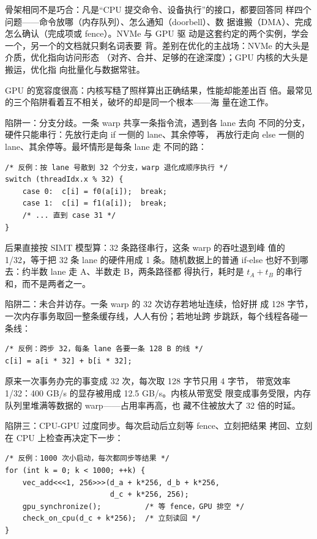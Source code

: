骨架相同不是巧合：凡是“CPU 提交命令、设备执行”的接口，都要回答同
样四个问题——命令放哪（内存队列）、怎么通知（doorbell）、数
据谁搬（DMA）、完成怎么确认（完成项或 fence）。NVMe 与 GPU 驱
动是这套约定的两个实例，学会一个，另一个的文档就只剩名词表要
背。差别在优化的主战场：NVMe 的大头是介质，优化指向访问形态
（对齐、合并、足够的在途深度）；GPU 内核的大头是搬运，优化指
向批量化与数据常驻。

GPU 的宽容度很高：内核写糙了照样算出正确结果，性能却能差出百
倍。最常见的三个陷阱看着互不相关，破坏的却是同一个根本——海
量在途工作。

陷阱一：分支分歧。一条 warp 共享一条指令流，遇到各 lane 去向
不同的分支，硬件只能串行：先放行走向 if 一侧的 lane、其余停等，
再放行走向 else 一侧的 lane、其余停等。最坏情形是每条 lane 走
不同的路：

\begin{lstlisting}
/* 反例：按 lane 号散到 32 个分支，warp 退化成顺序执行 */
switch (threadIdx.x % 32) {
    case 0:  c[i] = f0(a[i]);  break;
    case 1:  c[i] = f1(a[i]);  break;
    /* ... 直到 case 31 */
}
\end{lstlisting}

后果直接按 SIMT 模型算：32 条路径串行，这条 warp 的吞吐退到峰
值的 1/32，等于把 32 条 lane 的硬件用成 1 条。随机数据上的普通
if-else 也好不到哪去：约半数 lane 走 A、半数走 B，两条路径都
得执行，耗时是 $t_A+t_B$ 的串行和，而不是两者之一。

陷阱二：未合并访存。一条 warp 的 32 次访存若地址连续，恰好拼
成 128 字节，一次内存事务取回一整条缓存线，人人有份；若地址跨
步跳跃，每个线程各碰一条线：

\begin{lstlisting}
/* 反例：跨步 32，每条 lane 各要一条 128 B 的线 */
c[i] = a[i * 32] + b[i * 32];
\end{lstlisting}

原来一次事务办完的事变成 32 次，每次取 128 字节只用 4 字节，
带宽效率 1/32：400 GB/s 的显存被用成 12.5 GB/s。内核从带宽受
限变成事务受限，内存队列里堆满等数据的 warp——占用率再高，也
藏不住被放大了 32 倍的时延。

陷阱三：CPU-GPU 过度同步。每次启动后立刻等 fence、立刻把结果
拷回、立刻在 CPU 上检查再决定下一步：

\begin{lstlisting}
/* 反例：1000 次小启动，每次都同步等结果 */
for (int k = 0; k < 1000; ++k) {
    vec_add<<<1, 256>>>(d_a + k*256, d_b + k*256,
                        d_c + k*256, 256);
    gpu_synchronize();          /* 等 fence，GPU 排空 */
    check_on_cpu(d_c + k*256);  /* 立刻读回 */
}
\end{lstlisting}

